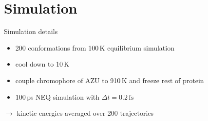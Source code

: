 \section{Simulation}

\begin{frame}[c]{Simulation details}
  \begin{itemize}
    \item 200 conformations from 100\,K equilibrium simulation
    \item cool down to 10\,K
    \item couple chromophore of AZU to 910\,K and freeze rest of protein
    \item 100\,ps NEQ simulation with $\Delta t = 0.2\,\text{fs}$
  \end{itemize}
  \vspace{5mm}
  $\rightarrow$ kinetic energies averaged over 200 trajectories
\end{frame}
